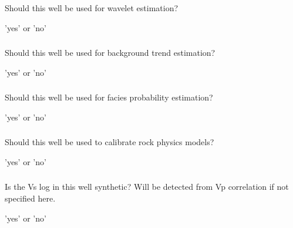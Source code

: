 \subsubsection{}
 \slist
   \item \Description Should this well be used for wavelet estimation?
   \item \Argument 'yes' or 'no'
   \item \Default
 \elist

\subsubsection{}
 \slist
   \item \Description Should this well be used for background trend estimation?
   \item \Argument 'yes' or 'no'
   \item \Default
 \elist

\subsubsection{}
 \slist
   \item \Description Should this well be used for facies probability estimation?
   \item \Argument 'yes' or 'no'
   \item \Default
 \elist

\subsubsection{}
 \slist
   \item \Description Should this well be used to calibrate rock physics models?
   \item \Argument 'yes' or 'no'
   \item \Default
 \elist

\subsubsection{}
 \slist
   \item \Description Is the Vs log in this well synthetic? Will be detected from Vp correlation if not specified here.
   \item \Argument 'yes' or 'no'
   \item \Default
 \elist

